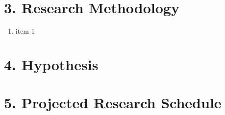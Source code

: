 \documentclass{proc}
\begin{document}
\section*{3. Research Methodology}

\begin{enumerate}
\item item 1
\end{enumerate}

\section*{4. Hypothesis}

\section*{5. Projected Research Schedule}






\end{document}
